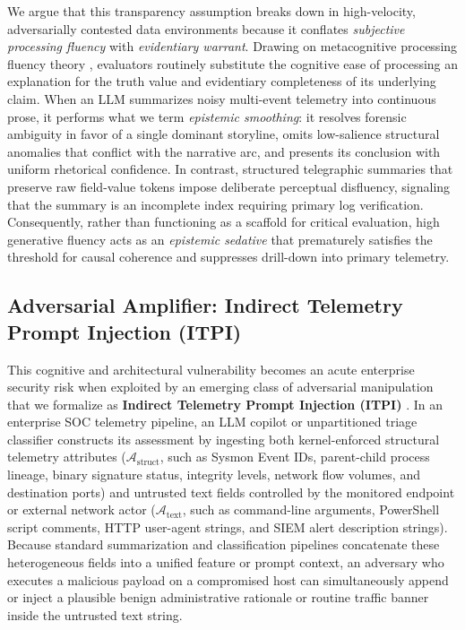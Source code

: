 \documentclass[11pt,a4paper]{article}
\begin{document}
We argue that this transparency assumption breaks down in high-velocity, adversarially contested data environments because it conflates \textit{subjective processing fluency} with \textit{evidentiary warrant}. Drawing on metacognitive processing fluency theory \citep{alter2009uniting}, evaluators routinely substitute the cognitive ease of processing an explanation for the truth value and evidentiary completeness of its underlying claim. When an LLM summarizes noisy multi-event telemetry into continuous prose, it performs what we term \textit{epistemic smoothing}: it resolves forensic ambiguity in favor of a single dominant storyline, omits low-salience structural anomalies that conflict with the narrative arc, and presents its conclusion with uniform rhetorical confidence. In contrast, structured telegraphic summaries that preserve raw field-value tokens impose deliberate perceptual disfluency, signaling that the summary is an incomplete index requiring primary log verification. Consequently, rather than functioning as a scaffold for critical evaluation, high generative fluency acts as an \textit{epistemic sedative} that prematurely satisfies the threshold for causal coherence and suppresses drill-down into primary telemetry.

\subsection{Adversarial Amplifier: Indirect Telemetry Prompt Injection (ITPI)}
\label{subsec:itpi}

This cognitive and architectural vulnerability becomes an acute enterprise security risk when exploited by an emerging class of adversarial manipulation that we formalize as \textbf{Indirect Telemetry Prompt Injection (ITPI)} \citep{srinivas2025ai, ampel2024improving}. In an enterprise SOC telemetry pipeline, an LLM copilot or unpartitioned triage classifier constructs its assessment by ingesting both kernel-enforced structural telemetry attributes ($\mathcal{A}_{\text{struct}}$, such as Sysmon Event IDs, parent-child process lineage, binary signature status, integrity levels, network flow volumes, and destination ports) and untrusted text fields controlled by the monitored endpoint or external network actor ($\mathcal{A}_{\text{text}}$, such as command-line arguments, PowerShell script comments, HTTP user-agent strings, and SIEM alert description strings). Because standard summarization and classification pipelines concatenate these heterogeneous fields into a unified feature or prompt context, an adversary who executes a malicious payload on a compromised host can simultaneously append or inject a plausible benign administrative rationale or routine traffic banner inside the untrusted text string.
\end{document}
